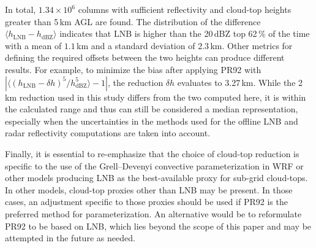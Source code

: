 In total, $1.34\times10^6$ columns with sufficient reflectivity and cloud-top
heights greater than 5\,\unit{km} AGL are found. The distribution of the
difference $\langle h_\textrm{LNB}-h_\textrm{dBZ}\rangle$ indicates that LNB is higher than
the 20\,\unit{dBZ} top 62\,{\%} of the time with a mean of $1.1$\,\unit{km}
and a standard deviation of $2.3$\,\unit{km}. Other metrics for defining the
required offsets between the two heights can produce different results. For
example, to minimize the bias after applying PR92 with
$\left|\langle(h_\textrm{LNB}-\delta h)^5/h_\textrm{dBZ}^5\rangle-1\right|$, the reduction
$\delta h$ evaluates to 3.27\,\unit{km}. While the 2\,\unit{km} reduction
used in this study differs from the two computed here, it is within the
calculated range and thus can still be considered a median representation,
especially when the uncertainties in the methods used for the offline LNB and
radar reflectivity computations are taken into account.

Finally, it is essential to re-emphasize that the choice of cloud-top
reduction is specific to the use of the Grell--Devenyi convective
parameterization in WRF or other models producing LNB as the best-available
proxy for sub-grid cloud-tops. In other models, cloud-top proxies other than
LNB may be present. In those cases, an adjustment specific to those proxies
should be used if PR92 is the preferred method for parameterization. An
alternative would be to reformulate PR92 to be based on LNB, which lies
beyond the scope of this paper and may be attempted in the future as needed.